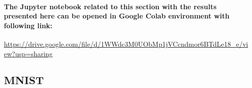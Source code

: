 \documentclass[a4paper]{article}    %
\begin{document}
\paragraph{The Jupyter notebook related to this section with the results presented here can be opened in Google Colab environment with following link:\\}

\href{https://drive.google.com/file/d/1WWdc3M0UObMp1jVCcndmor6BTdLe18\_e/view?usp=sharing}{https://drive.google.com/file/d/1WWdc3M0UObMp1jVCcndmor6BTdLe18\_e/view?usp=sharing}

\subsection{MNIST}

\graphicspath{{../figures/Q9/mnist/}}
\end{document}
